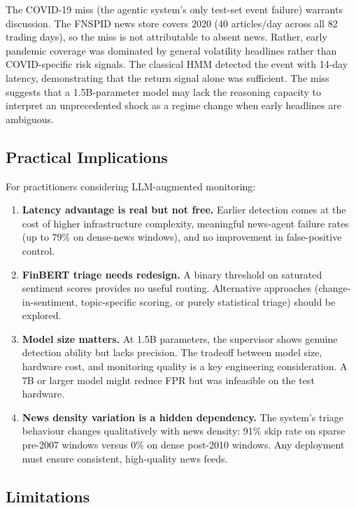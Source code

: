 \documentclass[11pt,a4paper]{article}
\begin{document}
The COVID-19 miss (the agentic system's only test-set event failure) warrants
discussion. The FNSPID news store covers 2020 (40 articles/day across all 82
trading days), so the miss is not attributable to absent news. Rather, early
pandemic coverage was dominated by general volatility headlines rather than
COVID-specific risk signals. The classical HMM detected the event with
14-day latency, demonstrating that the return signal alone was sufficient.
The miss suggests that a 1.5B-parameter model may lack the reasoning capacity
to interpret an unprecedented shock as a regime change when early headlines are
ambiguous.

\subsection{Practical Implications}\label{sec:implications}

For practitioners considering LLM-augmented monitoring:

\begin{enumerate}
  \item \textbf{Latency advantage is real but not free.} Earlier detection
        comes at the cost of higher infrastructure complexity, meaningful
        news-agent failure rates (up to 79\% on dense-news windows), and
        no improvement in false-positive control.
  \item \textbf{FinBERT triage needs redesign.} A binary threshold on
        saturated sentiment scores provides no useful routing. Alternative
        approaches (change-in-sentiment, topic-specific scoring, or purely
        statistical triage) should be explored.
  \item \textbf{Model size matters.} At 1.5B parameters, the supervisor
        shows genuine detection ability but lacks precision. The tradeoff
        between model size, hardware cost, and monitoring quality is a key
        engineering consideration. A 7B or larger model might reduce FPR
        but was infeasible on the test hardware.
  \item \textbf{News density variation is a hidden dependency.} The system's
        triage behaviour changes qualitatively with news density: 91\% skip
        rate on sparse pre-2007 windows versus 0\% on dense post-2010
        windows. Any deployment must ensure consistent, high-quality news
        feeds.
\end{enumerate}

\subsection{Limitations}\label{sec:limitations}
\end{document}
